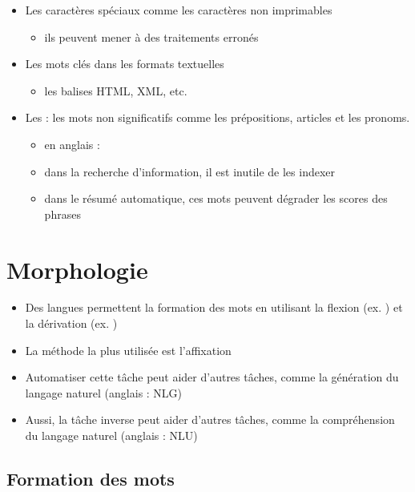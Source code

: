 \documentclass{KodeBook}
\begin{document}
\begin{itemize}
	\item Les caractères spéciaux comme les caractères non imprimables
	\begin{itemize}
		\item ils peuvent mener à des traitements erronés 
	\end{itemize}
	\item Les mots clés dans les formats textuelles
	\begin{itemize}
		\item les balises HTML, XML, etc. 
	\end{itemize}
	\item Les  : les mots non significatifs comme les prépositions, articles et les pronoms.
	\begin{itemize}
		\item en anglais : 
		\item dans la recherche d'information, il est inutile de les indexer
		\item dans le résumé automatique, ces mots peuvent dégrader les scores des phrases
	\end{itemize}
\end{itemize}

\section{Morphologie}

\begin{itemize}
	\item Des langues permettent la formation des mots en utilisant la flexion (ex. ) et la dérivation (ex. )
	\item La  méthode la plus utilisée est l'affixation 
	\item Automatiser cette tâche peut aider d'autres tâches, comme la génération du langage naturel (anglais : NLG)
	\item Aussi, la tâche inverse peut aider d'autres tâches, comme la compréhension du langage naturel (anglais : NLU)
\end{itemize}

\subsection{Formation des mots}
\end{document}
